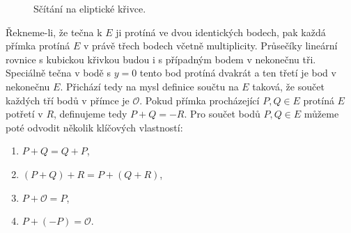 \documentclass[12pt]{report}
\begin{document}
\begin{figure}[h]
\begin{center}
\end{center}
\caption{Sčítání na eliptické křivce.}
\end{figure}

Řekneme-li, že tečna k $E$ ji protíná ve dvou identických bodech, pak každá přímka protíná $E$ v právě třech bodech včetně multiplicity. Průsečíky lineární rovnice s kubickou křivkou budou i s případným bodem v nekonečnu tři. Speciálně tečna v bodě s $y=0$ tento bod protíná dvakrát a ten třetí je bod v nekonečnu $E$. Přichází tedy na mysl definice součtu na $E$ taková, že součet každých tří bodů v přímce je $\mathcal{O}$. Pokud přímka procházející $P,Q \in E$ protíná $E$ potřetí v $R$, definujeme tedy $P+ Q = -R$. Pro součet bodů $P,Q \in E$ můžeme poté odvodit několik klíčových vlastností:
\begin{enumerate}
\item $P + Q = Q + P$,
\item $(P + Q) + R =P + ( Q + R)$,
\item $P + \mathcal{O} = P$,
\item $P + (-P) = \mathcal{O}$.
\end{enumerate} 
\end{document}
